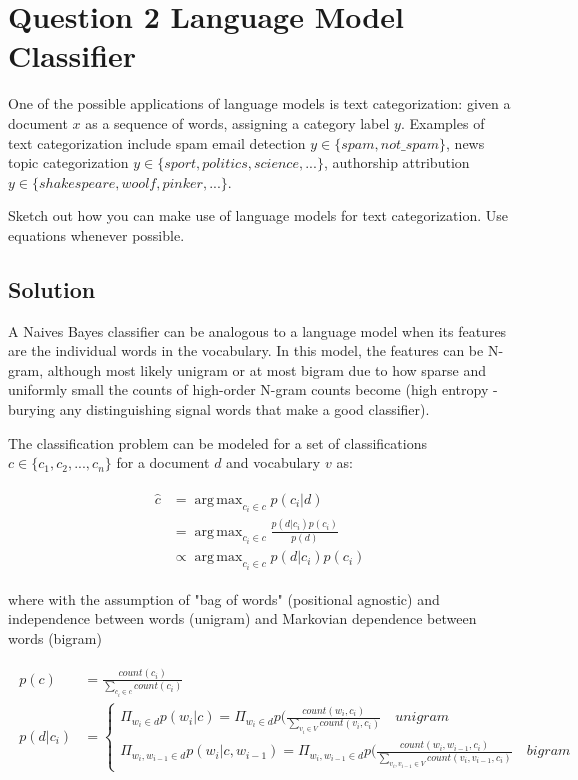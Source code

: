 \documentclass[11pt]{article}
\DeclareMathOperator*{\argmax}{arg\,max}
\begin{document}
\section*{Question 2 Language Model Classifier}

One of the possible applications of language models is text categorization: given a document $x$ as a sequence of words, assigning a category label $y$. Examples of text categorization include spam email detection $y \in \{spam, not\_spam\}$, news topic categorization $y \in \{sport, politics, science,...\}$, authorship attribution $y \in \{shakespeare, woolf, pinker, ...\}$. 

Sketch out how you can make use of language models for text categorization. Use equations whenever possible. 

\subsection*{Solution}

A Naives Bayes classifier can be analogous to a language model when its features are the individual words in the vocabulary. In this model, the features can be N-gram, although most likely unigram or at most bigram due to how sparse and uniformly small the counts of high-order N-gram counts become (high entropy - burying any distinguishing signal words that make a good classifier). 

The classification problem can be modeled for a set of classifications $c \in \{c_1, c_2, ..., c_n\}$ for a document $d$ and vocabulary $v$ as:

\begin{align}
	\begin{split}
	\hat{c}  &= \argmax_{c_i \in c} p( c_i | d ) \\
		    &= \argmax_{c_i \in c} \frac{ p(d | c_i) p(c_i)}{p(d)} \\
		    &\propto \argmax_{c_i \in c}  p( d | c_i )p( c_i )
	\end{split}
\end{align}

where with the assumption of "bag of words" (positional agnostic) and independence between words (unigram) and Markovian dependence between words (bigram)

\begin{align}
	\begin{split}
	p(c) &= \frac{count( c_i )}{\sum_{c_i \in c} count(c_i)} \\
	p( d | c_i ) &= \left\{
		\begin{array}{lll}
			\Pi_{w_i \in d} p( w_i | c ) =   \Pi_{w_i \in d} p(\frac{count(w_i ,c_i)}{\sum_{v_i \in V}count(v_i, c_i)} \quad unigram \\
			\Pi_{w_i, w_{i-1} \in d} p( w_i | c, w_{i-1} ) = \Pi_{w_i, w_{i-1} \in d} p(\frac{count(w_i , w_{i-1}, c_i)}{\sum_{v_i, v_{i-1} \in V}count(v_i, v_{i-1}, c_i)} \quad bigram
		\end{array}
		\right.	
	\end{split}
\end{align}
\end{document}
